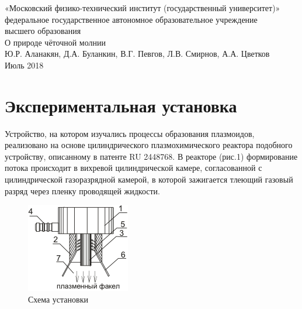 \documentclass[a4paper]{article}
\begin{document}
\begin{center}
\large{«Московский физико-технический институт (государственный университет)»}\\
\footnotesize{федеральное государственное автономное образовательное учреждение}\\ 
\footnotesize{высшего образования}\\
 \hfill \break
\hfill\break
\hfill \break
\hfill \break
\hfill \break
\large{О природе чёточной молнии}\\
\hfill \break
\hfill \break
\hfill \break
\hfill \break
\large{Ю.Р. Аланакян, Д.А. Буланкин, В.Г. Певгов, Л.В. Смирнов, А.А. Цветков}\\
\hfill \break
\hfill \break
\hfill \break
\hfill \break
\hfill \break
\normalsize{Июль 2018} 
\end{center}

\newpage

\section{Экспериментальная установка}
Устройство, на котором изучались процессы образования плазмоидов, реализовано на основе цилиндрического плазмохимического реактора подобного устройству, описанному в патенте RU 2448768. В реакторе (рис.1) формирование потока происходит в вихревой цилиндрической камере, согласованной с цилиндрической газоразрядной камерой, в которой зажигается тлеющий газовый разряд через пленку проводящей жидкости.
\begin{figure}[h]
    \includegraphics{ShemaUstanovki.png}
    \centering
    \caption{Схема установки}
\end{figure}
\end{document}
